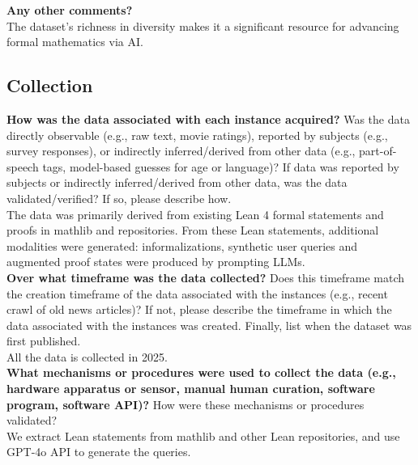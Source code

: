     \textcolor{\sectioncolor}{\textbf{Any other comments?
    }} \\
    The dataset’s richness in diversity makes it a significant resource for advancing formal mathematics via AI. \\

\subsection{Collection}

    \textcolor{\sectioncolor}{\textbf{How was the data associated with each instance acquired?
    }
    Was the data directly observable (e.g., raw text, movie ratings),
    reported by subjects (e.g., survey responses), or indirectly
    inferred/derived from other data (e.g., part-of-speech tags, model-based
    guesses for age or language)? If data was reported by subjects or
    indirectly inferred/derived from other data, was the data
    validated/verified? If so, please describe how.
    } \\
The data was primarily derived from existing Lean 4 formal statements and proofs in mathlib and repositories. From these Lean statements, additional modalities were generated: informalizations, synthetic user queries and augmented proof states were produced by prompting LLMs.\\
    
    \textcolor{\sectioncolor}{\textbf{Over what timeframe was the data collected?
    }
    Does this timeframe match the creation timeframe of the data associated
    with the instances (e.g., recent crawl of old news articles)? If not,
    please describe the timeframe in which the data associated with the
    instances was created. Finally, list when the dataset was first published.
    } \\
    All the data is collected in 2025. \\
    
    \textcolor{\sectioncolor}{\textbf{What mechanisms or procedures were used to collect the data (e.g., hardware
    apparatus or sensor, manual human curation, software program, software
    API)?
    }
    How were these mechanisms or procedures validated?
    } \\
    We extract Lean statements from mathlib and other Lean repositories, and use GPT-4o API to generate the queries. \\
    
